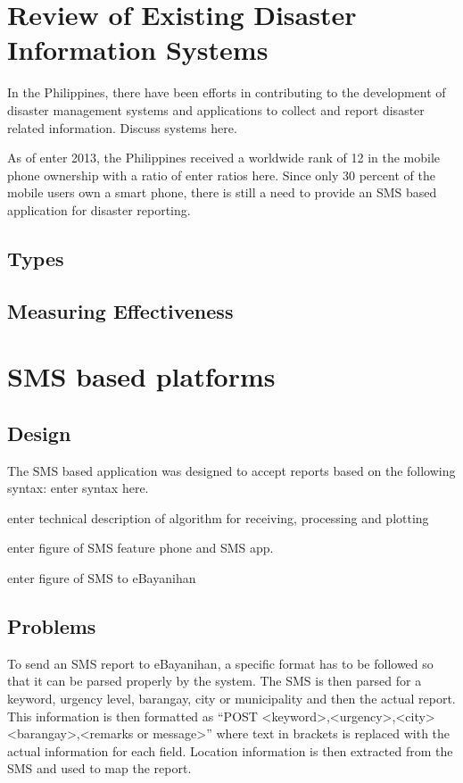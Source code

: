 \documentclass{acm_proc_article-sp}
\begin{document}
\section{Review of Existing Disaster Information Systems}

In the Philippines, there have been efforts in contributing to the development of disaster management systems and applications to collect and report disaster related information. Discuss systems here.

As of enter 2013, the Philippines received a worldwide rank of 12 in the mobile phone ownership with a ratio of enter ratios here. Since only 30 percent of the mobile users own a smart phone, there is still a need to provide an SMS based application for disaster reporting.

\subsection{Types}

\subsection{Measuring Effectiveness}

\section{SMS based platforms}
\subsection{Design}
The SMS based application was designed to accept reports based on the following syntax:
enter syntax here.

enter technical description of algorithm for receiving, processing and plotting

enter figure of SMS feature phone and SMS app.

enter figure of SMS to eBayanihan

\subsection{Problems}

To send an SMS report to eBayanihan, a specific format has to be followed so that it can be parsed properly by the system. The SMS is then parsed for a keyword, urgency level, barangay, city or municipality and then the actual report. This information is then formatted as ``POST <keyword>,<urgency>,<city> <barangay>,<remarks or message>'' where text in brackets is replaced with the actual information for each field. Location information is then extracted from the SMS and used to map the report. 
\end{document}
